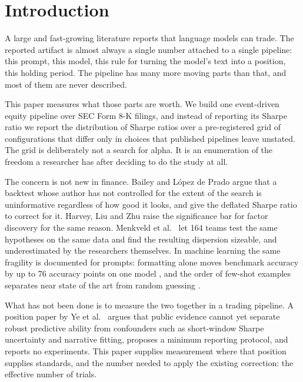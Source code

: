 \documentclass[sigconf]{acmart}
\begin{document}

\maketitle

\section{Introduction}

A large and fast-growing literature reports that language models can trade. The reported artifact is
almost always a single number attached to a single pipeline: this prompt, this model, this rule for
turning the model's text into a position, this holding period. The pipeline has many more moving
parts than that, and most of them are never described.

This paper measures what those parts are worth. We build one event-driven equity pipeline over SEC
Form 8-K filings, and instead of reporting its Sharpe ratio we report the distribution of Sharpe
ratios over a pre-registered grid of \NumConfigs{} configurations that differ only in choices that
published pipelines leave unstated. The grid is deliberately not a search for alpha. It is an
enumeration of the freedom a researcher has after deciding to do the study at all.

The concern is not new in finance. Bailey and L\'opez de Prado \cite{bailey2014deflated} argue that
a backtest whose author has not controlled for the extent of the search is uninformative regardless
of how good it looks, and give the deflated Sharpe ratio to correct for it. Harvey, Liu and Zhu
\cite{harvey2016cross} raise the significance bar for factor discovery for the same reason. Menkveld
et al.~\cite{menkveld2024nonstandard} let 164 teams test the same hypotheses on the same data and
find the resulting dispersion sizeable, and underestimated by the researchers themselves. In machine learning the same fragility is documented for prompts: formatting alone moves
benchmark accuracy by up to 76 accuracy points on one model \cite{sclar2024quantifying}, and the
order of few-shot examples separates near state of the art from random guessing
\cite{lu2022fantastically}.

What has not been done is to measure the two together in a trading pipeline. A position paper by Ye
et al.~\cite{ye2026alpha} argues that public evidence cannot yet separate robust predictive ability
from confounders such as short-window Sharpe uncertainty and narrative fitting, proposes a minimum
reporting protocol, and reports no experiments. This paper supplies measurement where that position
supplies standards, and the number needed to apply the existing correction: the effective number of
trials.
\end{document}
